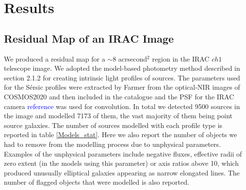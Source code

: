 \section{Results}

\subsection{Residual Map of an IRAC Image}
We produced a residual map for a $\sim 8$ acrsecond$^2$ region in the IRAC $ch1$ telescope image. We adopted the model-based photometry method described in section 2.1.2 for creating intrinsic light profiles of sources. The parameters used for the Sérsic profiles were extracted by Farmer from the optical-NIR images of COSMOS2020 and then included in the catalogue and the PSF for the IRAC camera \textcolor{blue}{reference} was used for convolution. In total we detected 9500 sources in the image and modelled 7173 of them, the vast majority of them being point source galaxies. The number of sources modelled with each profile type is reported in table \ref{Models_stat}. Here we also report the number of objects we had to remove from the modelling process due to unphysical parameters. Examples of the unphysical parameters include negative fluxes, effective radii of zero extent (in the models using this parameter) or axis ratios above 10, which produced unusually elliptical galaxies appearing as narrow elongated lines. The number of flagged objects that were modelled is also reported. %
